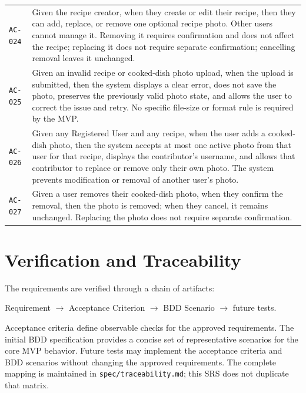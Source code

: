 \documentclass[12pt]{article}
\begin{document}
\begin{longtable}{p{} p{}}
\texttt{AC-024} & Given the recipe creator, when they create or edit their recipe, then they can add, replace, or remove one optional recipe photo. Other users cannot manage it. Removing it requires confirmation and does not affect the recipe; replacing it does not require separate confirmation; cancelling removal leaves it unchanged. \\
\texttt{AC-025} & Given an invalid recipe or cooked-dish photo upload, when the upload is submitted, then the system displays a clear error, does not save the photo, preserves the previously valid photo state, and allows the user to correct the issue and retry. No specific file-size or format rule is required by the MVP. \\
\texttt{AC-026} & Given any Registered User and any recipe, when the user adds a cooked-dish photo, then the system accepts at most one active photo from that user for that recipe, displays the contributor's username, and allows that contributor to replace or remove only their own photo. The system prevents modification or removal of another user's photo. \\
\texttt{AC-027} & Given a user removes their cooked-dish photo, when they confirm the removal, then the photo is removed; when they cancel, it remains unchanged. Replacing the photo does not require separate confirmation. \\
\end{longtable}

\section{Verification and Traceability}
The requirements are verified through a chain of artifacts:
\begin{center}
Requirement $\rightarrow$ Acceptance Criterion $\rightarrow$ BDD Scenario $\rightarrow$ future tests.
\end{center}

Acceptance criteria define observable checks for the approved requirements. The initial BDD specification provides a concise set of representative scenarios for the core MVP behavior. Future tests may implement the acceptance criteria and BDD scenarios without changing the approved requirements. The complete mapping is maintained in \texttt{spec/traceability.md}; this SRS does not duplicate that matrix.
\end{document}
